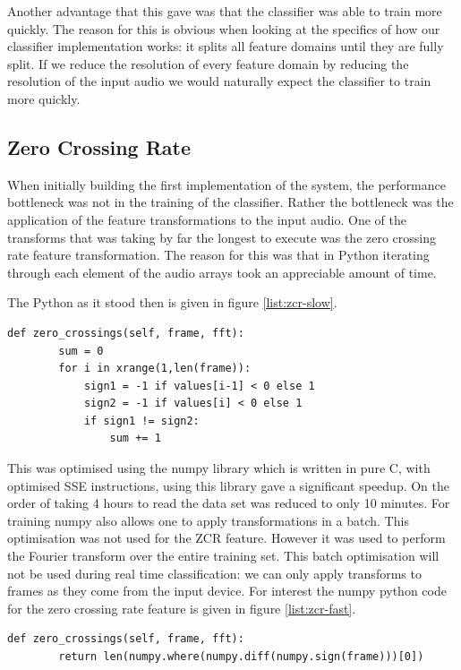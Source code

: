\documentclass[ %
                    author={Sam Phippen},
                supervisor={Dr. Rafal Bogacz},
                     title={Real time voice activity detectors in noisy personal computing environments},
                  subtitle={},
                    degree={MEng},
                      year={2012} ]{thesis}
\begin{document}
Another advantage that this gave was that the classifier was able to train more
quickly. The reason for this is obvious when looking at the specifics of how
our classifier implementation works: it splits all feature domains until they
are fully split. If we reduce the resolution of every feature domain by
reducing the resolution of the input audio we would naturally expect the
classifier to train more quickly.

\subsection{Zero Crossing Rate}

When initially building the first implementation of the system, the performance
bottleneck was not in the training of the classifier. Rather the bottleneck was
the application of the feature transformations to the input audio. One of the
transforms that was taking by far the longest to execute was the zero crossing
rate feature transformation. The reason for this was that in Python iterating
through each element of the audio arrays took an appreciable amount of time.

The Python as it stood then is given in figure \ref{list:zcr-slow}.


\begin{lstlisting}[frame=single,caption=Original slow zero crossing rate implementation, label=list:zcr-slow]  % Start your code-block
    def zero_crossings(self, frame, fft):
        sum = 0
        for i in xrange(1,len(frame)):
            sign1 = -1 if values[i-1] < 0 else 1
            sign2 = -1 if values[i] < 0 else 1
            if sign1 != sign2:
                sum += 1
\end{lstlisting}

This was optimised using the numpy library which is written in pure C, with
optimised SSE instructions, using this library gave a significant speedup. On
the order of taking 4 hours to read the data set was reduced to only 10
minutes. For training numpy also allows one to apply transformations in a
batch. This optimisation was not used for the ZCR feature. However it was used
to perform the Fourier transform over the entire training set. This batch
optimisation will not be used during real time classification: we can only
apply transforms to frames as they come from the input device. For interest the
numpy python code for the zero crossing rate feature is given in
figure \ref{list:zcr-fast}.

\begin{lstlisting}[frame=single,caption=Numpy fast zero crossing rate implementation, label=list:zcr-fast]
    def zero_crossings(self, frame, fft):
        return len(numpy.where(numpy.diff(numpy.sign(frame)))[0])
\end{lstlisting}
\end{document}
